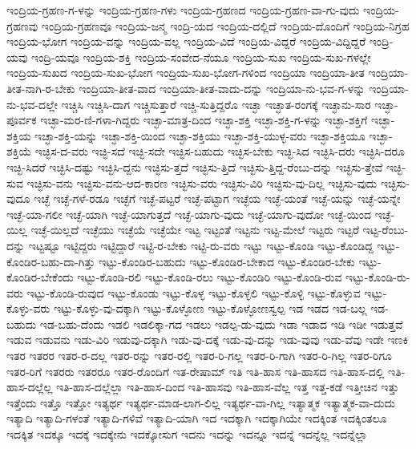 {ಇಂದ್ರಿಯ-ಗ್ರಹಣ-ಗ-ಳನ್ನು
ಇಂದ್ರಿಯ-ಗ್ರಹಣ-ಗಳು
ಇಂದ್ರಿಯ-ಗ್ರಹಣದ
ಇಂದ್ರಿಯ-ಗ್ರಹಣ-ವಾ-ಗು-ವುದು
ಇಂದ್ರಿಯ-ಗ್ರಹಣವು
ಇಂದ್ರಿಯ-ಗ್ರಹಣವೂ
ಇಂದ್ರಿಯ-ಜನ್ಮ
ಇಂದ್ರಿ-ಯದ
ಇಂದ್ರಿಯ-ದಲ್ಲಿದೆ
ಇಂದ್ರಿಯ-ದೊಂದಿಗೆ
ಇಂದ್ರಿಯ-ನಿಗ್ರಹ
ಇಂದ್ರಿಯ-ಭೋಗ
ಇಂದ್ರಿಯ-ವನ್ನು
ಇಂದ್ರಿಯ-ವಲ್ಲ
ಇಂದ್ರಿಯ-ವಿದೆ
ಇಂದ್ರಿಯ-ವಿದ್ದರೆ
ಇಂದ್ರಿಯ-ವಿದ್ದಿದ್ದರೆ
ಇಂದ್ರಿ-ಯವು
ಇಂದ್ರಿ-ಯವೂ
ಇಂದ್ರಿಯ-ಶಕ್ತಿ
ಇಂದ್ರಿಯ-ಸಂವೇದ-ನೆಯೂ
ಇಂದ್ರಿಯ-ಸುಖ
ಇಂದ್ರಿಯ-ಸುಖ-ಗಳಲ್ಲೇ
ಇಂದ್ರಿಯ-ಸುಖದ
ಇಂದ್ರಿಯ-ಸುಖ-ಭೋಗ
ಇಂದ್ರಿಯ-ಸುಖ-ಭೋಗ-ಗಳಿಂದ
ಇಂದ್ರಿಯಾ
ಇಂದ್ರಿಯಾ-ತೀತ
ಇಂದ್ರಿಯಾ-ತೀತ-ನಾಗಿ-ರ-ಬೇಕು
ಇಂದ್ರಿಯಾ-ತೀತ-ವಾದ
ಇಂದ್ರಿಯಾ-ತೀತ-ವಾದು-ದನ್ನು
ಇಂದ್ರಿಯಾ-ನು-ಭವ-ಗ-ಳನ್ನು
ಇಂದ್ರಿಯಾ-ನು-ಭವ-ದಲ್ಲೇ
ಇಚ್ಚಿಸಿ
ಇಚ್ಚಿಸಿ-ದಾಗ
ಇಚ್ಚಿಸುತ್ತಾರೆ
ಇಚ್ಚಿ-ಸುತ್ತಿದ್ದರೊ
ಇಚ್ಛಾ
ಇಚ್ಛಾತ-ರಂಗಕ್ಕೆ
ಇಚ್ಛಾನು-ಸಾರ
ಇಚ್ಛಾ-ಪೂರ್ವಕ
ಇಚ್ಛಾ-ಮರ-ಣಿ-ಗಳಾ-ಗಿದ್ದರು
ಇಚ್ಛಾ-ಮಾತ್ರ-ದಿಂದ
ಇಚ್ಛಾ-ಶಕ್ತಿ
ಇಚ್ಛಾ-ಶಕ್ತಿ-ಗ-ಳನ್ನು
ಇಚ್ಛಾ-ಶಕ್ತಿಗೆ
ಇಚ್ಛಾ-ಶಕ್ತಿಯ
ಇಚ್ಛಾ-ಶಕ್ತಿ-ಯನ್ನು
ಇಚ್ಛಾ-ಶಕ್ತಿ-ಯಿಂದ
ಇಚ್ಛಾ-ಶಕ್ತಿಯು
ಇಚ್ಛಾ-ಶಕ್ತಿ-ಯುಳ್ಳ-ವರು
ಇಚ್ಛಾ-ಶಕ್ತಿಯೂ
ಇಚ್ಛಾ-ಶಕ್ತಿಯೆ
ಇಚ್ಛಿಸ-ದ-ವರು
ಇಚ್ಛಿ-ಸದೆ
ಇಚ್ಛಿ-ಸದೇ
ಇಚ್ಛಿಸ-ಬಹುದು
ಇಚ್ಛಿಸ-ಬೇಕು
ಇಚ್ಛಿ-ಸಿದ
ಇಚ್ಛಿಸಿ-ದರು
ಇಚ್ಛಿಸಿ-ದರೂ
ಇಚ್ಛಿ-ಸಿದರೆ
ಇಚ್ಛಿಸಿ-ದಷ್ಟು
ಇಚ್ಛಿಸಿ-ದ್ದನು
ಇಚ್ಛಿಸು-ತ್ತದೆ
ಇಚ್ಛಿಸು-ತ್ತಿದೆ
ಇಚ್ಛಿಸು-ತ್ತಿದ್ದ-ರೆಂಬು-ದನ್ನು
ಇಚ್ಛಿಸು-ತ್ತೇವೆ
ಇಚ್ಛಿ-ಸುವ
ಇಚ್ಛಿಸು-ವನು
ಇಚ್ಛಿಸು-ವನು-ಆದ-ಕಾರಣ
ಇಚ್ಛಿಸು-ವರು
ಇಚ್ಛಿಸು-ವಿರಿ
ಇಚ್ಛಿಸು-ವು-ದಿಲ್ಲ
ಇಚ್ಛಿಸು-ವುದು
ಇಚ್ಛಿಸು-ವುದೂ
ಇಚ್ಛೆ
ಇಚ್ಛೆ-ಗಳೆ-ರಡೂ
ಇಚ್ಛೆಗೆ
ಇಚ್ಛೆ-ಪಟ್ಟರೆ
ಇಚ್ಛೆ-ಪಟ್ಟಾಗ
ಇಚ್ಛೆಯ
ಇಚ್ಛೆ-ಯಂತೆ
ಇಚ್ಛೆ-ಯನ್ನು
ಇಚ್ಛೆ-ಯನ್ನೇ
ಇಚ್ಛೆ-ಯಾ-ಗಲೀ
ಇಚ್ಛೆ-ಯಾಗಿ
ಇಚ್ಛೆ-ಯಾಗುತ್ತದೆ
ಇಚ್ಛೆ-ಯಾಗು-ವುದು
ಇಚ್ಛೆ-ಯಾಗು-ವುದೋ
ಇಚ್ಛೆ-ಯಿಂದ
ಇಚ್ಛೆ-ಯಿಲ್ಲ
ಇಚ್ಛೆ-ಯಿಲ್ಲದೆ
ಇಚ್ಛೆಯು
ಇಚ್ಛೆಯೆ
ಇಚ್ಛೆಯೇ
ಇಟ್ಟ
ಇಟ್ಟಂತೆ
ಇಟ್ಟನು
ಇಟ್ಟ-ಮೇಲೆ
ಇಟ್ಟರು
ಇಟ್ಟರೆ
ಇಟ್ಟ-ರೆಂಬು-ದನ್ನು
ಇಟ್ಟಷ್ಟೂ
ಇಟ್ಟಿದ್ದರು
ಇಟ್ಟಿದ್ದಾರೆ
ಇಟ್ಟಿ-ರ-ಬೇಕು
ಇಟ್ಟಿ-ರು-ವರು
ಇಟ್ಟು
ಇಟ್ಟು-ಕೊಂಡಿ
ಇಟ್ಟು-ಕೊಂಡಿದ್ದ
ಇಟ್ಟು-ಕೊಂಡಿರ-ಬಹು-ದಾ-ಗಿತ್ತು
ಇಟ್ಟು-ಕೊಂಡಿರ-ಬಹುದು
ಇಟ್ಟು-ಕೊಂಡಿರ-ಬೇಕಾದ
ಇಟ್ಟು-ಕೊಂಡಿರ-ಬೇಕು
ಇಟ್ಟು-ಕೊಂಡಿರ-ಬೇಕೆಂದು
ಇಟ್ಟು-ಕೊಂಡಿ-ರಲಿ
ಇಟ್ಟು-ಕೊಂಡಿ-ರಲು
ಇಟ್ಟು-ಕೊಂಡಿರಿ
ಇಟ್ಟು-ಕೊಂಡಿ-ರುವ
ಇಟ್ಟು-ಕೊಂಡಿ-ರು-ವರು
ಇಟ್ಟು-ಕೊಂಡಿ-ರುವುದ
ಇಟ್ಟು-ಕೊಂಡು
ಇಟ್ಟು-ಕೊಳ್ಳ
ಇಟ್ಟು-ಕೊಳ್ಳಲಿ
ಇಟ್ಟು-ಕೊಳ್ಳಿ
ಇಟ್ಟು-ಕೊಳ್ಳುವ
ಇಟ್ಟು-ಕೊಳ್ಳು-ವರು
ಇಟ್ಟು-ಕೊಳ್ಳು-ವು-ದಕ್ಕಾಗಿ
ಇಟ್ಟು-ಕೊಳ್ಳೋಣ
ಇಟ್ಟು-ಕೊಳ್ಳೋಣಸ್ವಲ್ಪ
ಇಡ
ಇಡದ
ಇಡ-ಬಲ್ಲ
ಇಡ-ಬಹುದು
ಇಡ-ಬಹು-ದೆಂದು
ಇಡಲಿ
ಇಡಲಿಕ್ಕಾ-ಗದ
ಇಡಲು
ಇಡಲ್ಪ-ಡು-ವುದು
ಇಡಾ
ಇಡಾದ
ಇಡಿ
ಇಡೀ
ಇಡುತ್ತವೆ
ಇಡುವ
ಇಡುವನು
ಇಡು-ವಿರಿ
ಇಡುವು-ದಕ್ಕಾಗಿ
ಇಡು-ವು-ದಕ್ಕೆ
ಇಡು-ವು-ದನ್ನು
ಇಡು-ವುವು
ಇಡು-ವೆವು
ಇಡೇ
ಇಣಕಿ
ಇತರ
ಇತರರ
ಇತರ-ರ-ದಲ್ಲ
ಇತರ-ರನ್ನು
ಇತರ-ರಲ್ಲಿ
ಇತರ-ರಿ-ಗಲ್ಲ
ಇತರ-ರಿ-ಗಾಗಿ
ಇತರ-ರಿ-ಗಿಲ್ಲ
ಇತರ-ರಿಗೂ
ಇತರ-ರಿಗೆ
ಇತರರು
ಇತರರೂ
ಇತರ-ರೊಂದಿಗೆ
ಇತ-ರೇಷಾಮ್
ಇತಿ
ಇತಿ-ಹಾಸ
ಇತಿ-ಹಾಸದ
ಇತಿ-ಹಾಸ-ದಲ್ಲಿ
ಇತಿ-ಹಾಸ-ದಲ್ಲೆಲ್ಲ
ಇತಿ-ಹಾಸ-ದಲ್ಲೆಲ್ಲಾ
ಇತಿ-ಹಾಸ-ದಿಂದ
ಇತಿ-ಹಾಸವು
ಇತಿ-ಹಾಸ-ವೆಲ್ಲ
ಇತ್ತ
ಇತ್ತ-ಕಡೆ
ಇತ್ತೀಚಿನ
ಇತ್ತು
ಇತ್ತೆಂದು
ಇತ್ತೊ
ಇತ್ತೋ
ಇತ್ಯರ್ಥ
ಇತ್ಯರ್ಥ-ಮಾಡ-ಲಾಗ-ಲಿಲ್ಲ
ಇತ್ಯರ್ಥ-ವಾ-ಗಿಲ್ಲ
ಇತ್ಯಾತ್ಮಕ
ಇತ್ಯಾತ್ಮಕ-ವಾ-ದುದು
ಇತ್ಯಾದಿ
ಇತ್ಯಾದಿ-ಗಳಂತೆ
ಇತ್ಯಾದಿ-ಗಳಿವೆ
ಇತ್ಯಾದಿ-ಯಾಗಿ
ಇದ
ಇದಕ್ಕಾಗಿ
ಇದಕ್ಕಾಗಿಯೇ
ಇದಕ್ಕಿಂತ
ಇದಕ್ಕಿಂತಲೂ
ಇದಕ್ಕಿತ
ಇದಕ್ಕೂ
ಇದಕ್ಕೆ
ಇದಕ್ಕೇನು
ಇದಕ್ಕೋಸುಗ
ಇದನು
ಇದನ್ನು
ಇದನ್ನೂ
ಇದನ್ನೆ
ಇದನ್ನೆಲ್ಲ
ಇದನ್ನೆಲ್ಲಾ
}
